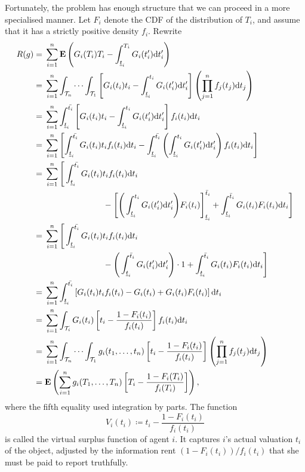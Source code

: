\documentclass[11pt,letterpaper,reqno,oneside]{article}
\begin{document}
Fortunately, the problem has enough structure that we can proceed in a more specialised manner. Let $F_i$ denote the CDF of the distribution of $T_i$, and assume that it has a strictly positive density $f_i$. Rewrite
%
\begin{align*}
	R(g)
	={}& \sum_{i=1}^n \mathbf{E}\left( 
	G_i(T_i) T_i - \int_{\underline{t}_i}^{T_i} G_i(t_i') \mathrm{d} t_i'
	\right) 
	\\
	={}& \sum_{i=1}^n \int_{\mathcal{T}_n} \cdots \int_{\mathcal{T}_1}
	\left[
	G_i(t_i) t_i - \int_{\underline{t}_i}^{t_i} G_i(t_i') \mathrm{d} t_i'
	\right]
	\left( \prod_{j=1}^n f_j(t_j) \mathrm{d} t_j \right)
	\\
	={}& \sum_{i=1}^n \int_{\underline{t}_i}^{\bar{t_i}}
	\left[
	G_i(t_i) t_i - \int_{\underline{t}_i}^{t_i} G_i(t_i') \mathrm{d} t_i'
	\right]
	f_i(t_i) \mathrm{d} t_i
	\\
	={}& \sum_{i=1}^n \left[
	\int_{\underline{t}_i}^{\bar{t_i}}
	G_i(t_i) t_i f_i(t_i) \mathrm{d} t_i
	- \int_{\underline{t}_i}^{\bar{t_i}} 
	\left( \int_{\underline{t}_i}^{t_i} G_i(t_i')
	\mathrm{d} t_i' \right) f_i(t_i) \mathrm{d} t_i
	\right]
	\\
	={}& \sum_{i=1}^n \Bigg[
	\int_{\underline{t}_i}^{\bar{t_i}}
	G_i(t_i) t_i f_i(t_i) \mathrm{d} t_i
	\\
	&\quad\quad\quad\quad\quad\quad\quad
	- \Bigg[
	\Bigg( \int_{\underline{t}_i}^{t_i} G_i(t_i')
	\mathrm{d} t_i' \Bigg) F_i(t_i)
	\Bigg]_{\underline{t}_i}^{\bar{t}_i}
	+ \int_{\underline{t}_i}^{\bar{t}_i}
	G_i(t_i) F_i(t_i)
	\mathrm{d} t_i
	\Bigg]
	\\
	={}& \sum_{i=1}^n \Bigg[
	\int_{\underline{t}_i}^{\bar{t_i}}
	G_i(t_i) t_i f_i(t_i) \mathrm{d} t_i
	\\
	&\quad\quad\quad\quad\quad\quad\quad
	- \Bigg( \int_{\underline{t}_i}^{\bar{t}_i} G_i(t_i')
	\mathrm{d} t_i' \Bigg) \cdot 1
	+ \int_{\underline{t}_i}^{\bar{t}_i}
	G_i(t_i) F_i(t_i)
	\mathrm{d} t_i
	\Bigg]
	\\
	={}& \sum_{i=1}^n \int_{\underline{t}_i}^{\bar{t_i}}
	\left[
	G_i(t_i) t_i f_i(t_i)
	- G_i(t_i)
	+ 
	G_i(t_i) F_i(t_i)
	\right]
	\mathrm{d} t_i
	\\
	={}& \sum_{i=1}^n \int_{\mathcal{T}_i}
	G_i(t_i) \left[ t_i - \frac{ 1 - F_i(t_i) }{ f_i(t_i) } \right]
	f_i(t_i) \mathrm{d} t_i
	\\
	={}& \sum_{i=1}^n \int_{\mathcal{T}_n} \cdots \int_{\mathcal{T}_1}
	g_i(t_1,\dots,t_n) \left[ t_i - \frac{ 1 - F_i(t_i) }{ f_i(t_i) } \right]
	\left( \prod_{j=1}^n f_j(t_j) \mathrm{d} t_j \right)
	\\
	={}& \mathbf{E}\left( \sum_{i=1}^n 
	g_i(T_1,\dots,T_n) \left[ T_i - \frac{ 1 - F_i(T_i) }{ f_i(T_i) } \right]
	\right) ,
\end{align*}
%
where the fifth equality used integration by parts. The function
%
\begin{equation*}
	V_i(t_i) \coloneqq t_i - \frac{ 1 - F_i(t_i) }{ f_i(t_i) }
\end{equation*}
%
is called the virtual surplus function of agent $i$. It captures $i$'s actual valuation $t_i$ of the object, adjusted by the information rent $( 1 - F_i(t_i) ) / f_i(t_i)$ that she must be paid to report truthfully.
\end{document}

